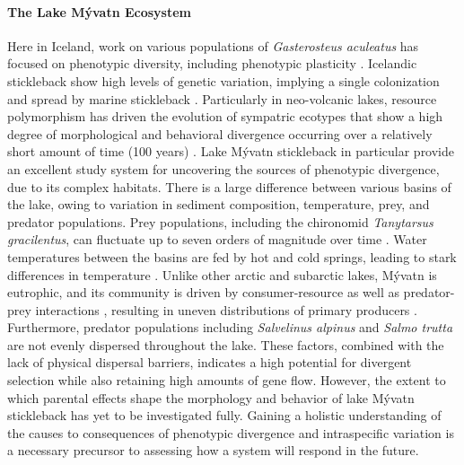 \documentclass[12pt]{extarticle}
\begin{document}
\paragraph{The Lake M\'yvatn Ecosystem}
Here in Iceland, work on various populations of \textit{Gasterosteus aculeatus} has focused on phenotypic diversity, including phenotypic plasticity \citep{Kristjansson2002, Millet2013}. Icelandic stickleback show high levels of genetic variation, implying a single colonization and spread by marine stickleback \citep{Olafsdottir2007}. Particularly in neo-volcanic lakes, resource polymorphism has driven the evolution of sympatric ecotypes \citep{Olafsdottir2007, Kristjansson2002} that show a high degree of morphological and behavioral divergence occurring over a relatively short amount of time (100 years) \citep{Lucek2014}. Lake M\'yvatn stickleback in particular provide an excellent study system for uncovering the sources of phenotypic divergence, due to its complex habitats. There is a large difference between various basins of the lake, owing to variation in sediment composition, temperature, prey, and predator populations. Prey populations, including the chironomid \textit{Tanytarsus gracilentus}, can fluctuate up to seven orders of magnitude over time \citep{Bartrons2018}.  Water temperatures between the basins are fed by hot and cold springs, leading to stark differences in temperature \citep{Einarsson2004}. Unlike other arctic and subarctic lakes, M\'yvatn is eutrophic, and its community is driven by consumer-resource as well as predator-prey interactions \citep{Bartrons2018}, resulting in uneven distributions of primary producers \citep{Einarsson2004}. Furthermore, predator populations including \textit{Salvelinus alpinus} and \textit{Salmo trutta} are not evenly dispersed throughout the lake. These factors, combined with the lack of physical dispersal barriers, indicates a high potential for divergent selection while also retaining high amounts of gene flow. However, the extent to which parental effects shape the morphology and behavior of lake M\'yvatn stickleback has yet to be investigated fully. Gaining a holistic understanding of the causes to consequences of phenotypic divergence and intraspecific variation is a necessary precursor to assessing how a system will respond in the future.
\end{document}

